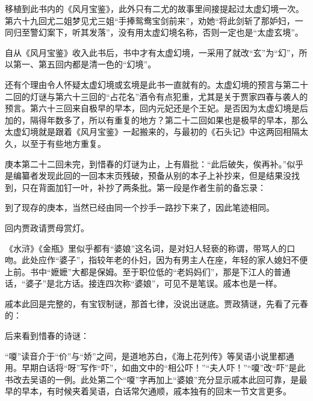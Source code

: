 \par 移植到此书内的《风月宝鉴》，此外只有二尤的故事里间接提起过太虚幻境一次。第六十九回尤二姐梦见尤三姐“手捧鸳鸯宝剑前来”，劝她“将此剑斩了那妒妇，一同归至警幻案下，听其发落”，没有用太虚幻境名称，否则一定也是“太虚玄境”。
\par 自从《风月宝鉴》收入此书后，书中才有太虚幻境，一采用了就改“玄”为“幻”，所以第一、第五回内都是清一色的“幻境”。
\par 还有个理由令人怀疑太虚幻境或玄境是此书一直就有的。太虚幻境的预言与第二十二回的灯谜与第六十三回的“占花名”酒令有点犯重，尤其是关于贾家四春与袭人的预言。第六十三回来自极早的早本，回内元妃还是个王妃。是否因为太虚幻境是后加的，隔得年数多了，所以有重复的地方？第二十二回如果也是极早的早本，那么太虚幻境就是跟着《风月宝鉴》一起搬来的，与最初的《石头记》中这两回相隔太久，以至于有些地方重复。
\par 庚本第二十二回未完，到惜春的灯谜为止，上有眉批：“此后破失，俟再补。”似乎是编纂者发现此回的一回本末页残破，预备从别的本子上补抄来，但是结果没找到，只在背面加钉一叶，补抄了两条批。第一段是作者生前的备忘录：
\par 到了现存的庚本，当然已经由同一个抄手一路抄下来了，因此笔迹相同。
\par 回内贾政请贾母赏灯。
\par 《水浒》《金瓶》里似乎都有“婆娘”这名词，是对妇人轻亵的称谓，带骂人的口吻。此处应作“婆子”，指较年老的仆妇，因为有男主人在座，年轻的家人媳妇不便上前。书中“嬷嬷”大都是保姆。至于职位低的“老妈妈们”，那是下江人的普通话，“婆子”是北方话。接连四次称“婆娘”，可见不是笔误。戚本也是一样。
\par 戚本此回是完整的，有宝钗制谜，那首七律，没说出谜底。贾政猜谜，先看了元春的：
\par 后来看到惜春的诗谜：
\par “嗄”读音介于“价”与“娇”之间，是道地苏白，《海上花列传》等吴语小说里都通用。早期白话将“呀”写作“吓”，如曲文中的“相公吓！”“夫人吓！”“嗄”改“吓”是此书改去吴语的一例。此处第二个“嗄”字再加上“婆娘”充分显示戚本此回可靠，是最早的早本，有时候夹着吴语，白话常欠通顺，戚本独有的回末一节文言更多。
